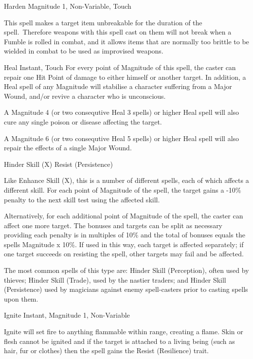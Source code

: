 \begin{rpg-spell}
{Harden}
{Magnitude 1, Non-Variable, Touch}

This spell makes a target item unbreakable for the duration of the spell. Therefore weapons with this spell cast on them will not break when a Fumble is rolled in combat, and it allows items that are normally too brittle to be wielded in combat to be used as improvised weapons.
\end{rpg-spell}


\begin{rpg-spell}
{Heal}
{Instant, Touch}
For every point of Magnitude of this spell, the caster can repair one Hit Point of damage to either himself or another target. In addition, a Heal spell of any Magnitude will stabilise a character suffering from a Major Wound, and/or revive a character who is unconscious. 

A Magnitude 4 (or two consequtive Heal 3 spells) or higher Heal spell will also cure any single poison or disease affecting the target. 

A Magnitude 6 (or two consequtive Heal 5 spells) or higher Heal spell will also repair the effects of a single Major Wound.
\end{rpg-spell}


\begin{rpg-spell}
{Hinder Skill (X)}
{Resist (Persistence)}

Like Enhance Skill (X), this is a number of different spells, each of which affects a different skill. For each point of Magnitude of the spell, the target gains a -10\% penalty to the next skill test using the affected skill.

Alternatively, for each additional point of Magnitude of the spell, the caster can affect one more target.  The bonuses and targets can be split as necessary providing each penalty is in multiples of 10\% and the total of bonuses equals the spells Magnitude x 10\%. If used in this way, each target is affected separately; if one target succeeds on resisting the spell, other targets may fail and be affected.

The most common spells of this type are: Hinder Skill (Perception), often used by thieves; Hinder Skill (Trade), used by the nastier traders; and Hinder Skill (Persistence) used by magicians against enemy spell-casters prior to casting spells upon them.
\end{rpg-spell}


\begin{rpg-spell}
{Ignite}
{Instant, Magnitude 1, Non-Variable}

Ignite will set fire to anything flammable within range, creating a flame. Skin or flesh cannot be ignited and if the target is attached to a living being (such as hair, fur or clothes) then the spell gains the Resist (Resilience) trait. 
\end{rpg-spell}


